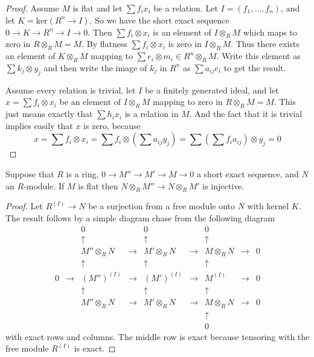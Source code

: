 \begin{proof}
Assume $M$ is flat and let $\sum f_i x_i$ be a relation.
Let $I = (f_1, \ldots, f_n)$, and let $K = \text{ker}(R^n \to I)$.
So we have the short exact sequence
$0\to K \to R^n \to I\to 0$. Then $\sum f_i \otimes x_i$
is an element of $I\otimes_R M$ which maps
to zero in $R\otimes_R M = M$. By flatness
$\sum f_i \otimes x_i$ is zero in $I\otimes_R M$.
Thus there exists an element of $K\otimes_R M$ mapping
to $\sum e_i \otimes m_i \in R^n\otimes_R M$.
Write this element as $\sum k_j \otimes y_j$
and then write the image of $k_j$ in $R^n$ as
$\sum a_{ij} e_i$ to get the result.

\medskip\noindent
Assume every relation is trivial, let $I$
be a finitely generated ideal, and let $x = \sum f_i\otimes x_i$
be an element of $I\otimes_R M$ mapping to zero in $R\otimes_R M = M$.
This just means exactly that $\sum h_i x_i$ is a relation in
$M$. And the fact that it is trivial implies easily that
$x$ is zero, because
$$
x
=
\sum f_i \otimes x_i
=
\sum f_i \otimes (\sum a_{ij}y_j)
=
\sum (\sum f_i a_{ij}) \otimes y_j
=
0
$$
\end{proof}

\begin{lemma}
\label{lemma-flat-tor-zero}
Suppose that $R$ is a ring, $0 \to M'' \to M' \to M \to 0$
a short exact sequence, and $N$ an $R$-module. If $M$ is flat
then $N\otimes_R M'' \to N\otimes_R M'$ is injective.
\end{lemma}

\begin{proof}
Let $R^{(I)} \to N$ be a surjection from a free module
onto $N$ with kernel $K$. The result follows
by a simple diagram chase from the following diagram
$$
\begin{matrix}
&
&
0
&
&
0
&
&
0
&
&
\\
&
&
\uparrow
&
&
\uparrow
&
&
\uparrow
&
&
\\
&
&
M''\otimes_R N
&
\to
&
M' \otimes_R N
&
\to
&
M\otimes_R N
&
\to
&
0
\\
&
&
\uparrow
&
&
\uparrow
&
&
\uparrow
&
&
\\
0
&
\to
&
(M'')^{(I)}
&
\to
&
(M')^{(I)}
&
\to
&
M^{(I)}
&
\to
&
0
\\
&
&
\uparrow
&
&
\uparrow
&
&
\uparrow
&
&
\\
&
&
M''\otimes_R N
&
\to
&
M' \otimes_R N
&
\to
&
M\otimes_R N
&
\to
&
0
\\
&
&
&
&
&
&
\uparrow
&
&
\\
&
&
&
&
&
&
0
&
&
\end{matrix}
$$
with exact rows and columns. The middle row is exact because tensoring
with the free module $R^{(I)}$ is exact.
\end{proof}


